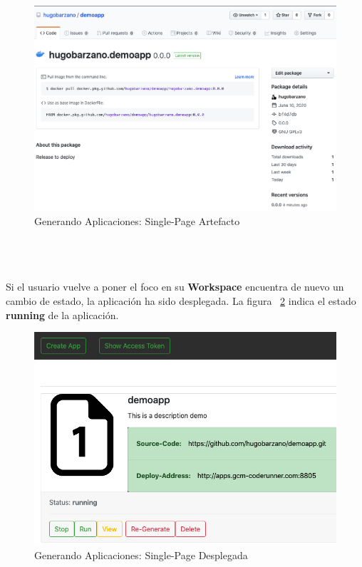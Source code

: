 \documentclass[a4paper,11pt]{book}
\begin{document}
\begin{figure}[H]
\centering
\includegraphics[scale=0.35]{imagenes/casouso_a/15.png}
\caption{  Generando Aplicaciones: Single-Page Artefacto}
\label{15}
\end{figure}
~\\
~\\
~\\
Si el usuario vuelve a poner el foco en su \textbf{Workspace} encuentra de nuevo un cambio de estado, la aplicación ha sido desplegada. La figura ~\ref{16} indica el estado \textbf{running} de la aplicación. 

\begin{figure}[H]
\centering
\includegraphics[scale=0.45]{imagenes/casouso_a/16.png}
\caption{   Generando Aplicaciones: Single-Page Desplegada }
\label{16}
\end{figure}
\end{document}
